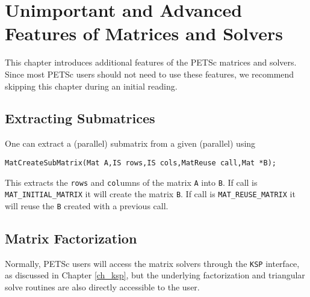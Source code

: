 {{%

\cleardoublepage
\chapter{Unimportant and Advanced Features of Matrices and Solvers}
\label{ch_advanced}

This chapter introduces additional features of the PETSc matrices and solvers.
Since most PETSc users should not need to use these features,
we recommend skipping this chapter during an initial reading.

\medskip \medskip

\section{Extracting Submatrices} 

One can extract a (parallel) submatrix from a given (parallel) using
\begin{lstlisting}
MatCreateSubMatrix(Mat A,IS rows,IS cols,MatReuse call,Mat *B);
\end{lstlisting}
This extracts the \lstinline{rows} and \lstinline{col}umns of the matrix \lstinline{A} into \lstinline{B}. If
call is  \lstinline{MAT_INITIAL_MATRIX}  it will create the matrix
\lstinline{B}. If call is \lstinline{MAT_REUSE_MATRIX}  it will reuse the \lstinline{B}
created with a previous call.

\medskip \medskip

\section{Matrix Factorization} 
\label{sec_matfactor}

Normally, PETSc users will access the matrix solvers through the
\lstinline{KSP} interface, as discussed in Chapter \ref{ch_ksp}, but the underlying
factorization and triangular solve routines are also directly
accessible to the user.

\medskip \medskip

}}
